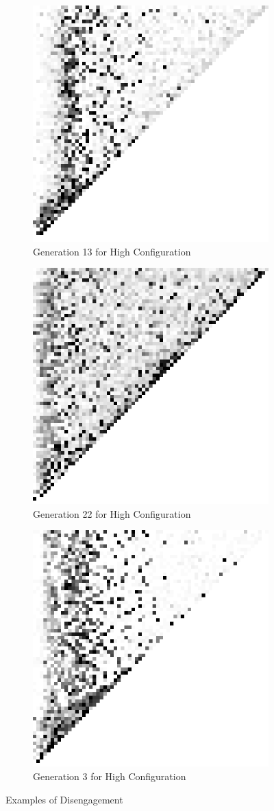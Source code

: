 \begin{figure}[H]
    \begin{subfigure}{.4\textwidth}
        \centering
        \includegraphics[width=0.4\linewidth]{images/disengagement/high_config13.png}
        \caption{Generation 13 for High Configuration}
        \label{fig:sfig1}
    \end{subfigure}
    \begin{subfigure}{.4\textwidth}
        \centering
        \includegraphics[width=0.4\linewidth]{images/disengagement/high_config22.png}
        \caption{Generation 22 for High Configuration}
        \label{fig:sfig2}
    \end{subfigure}
    \begin{subfigure}{.4\textwidth}
        \centering
        \includegraphics[width=0.4\linewidth]{images/disengagement/max_config3.png}
        \caption{Generation 3 for High Configuration}
        \label{fig:sfig4}
    \end{subfigure}
    \caption{Examples of Disengagement}
    \label{ap_dis}
\end{figure}

